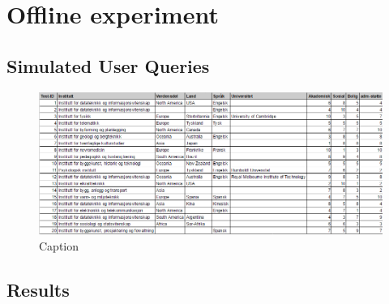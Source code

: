 \chapter{Offline experiment}

\section{Simulated User Queries}
\label{app:user_queries}

\begin{figure}[h]
    \centering
    \includegraphics[width=1.0\textwidth]{fig/simulated_queries.PNG}
    \caption[]{Caption}
    \label{fig:my_label}
\end{figure}


\section{Results}

